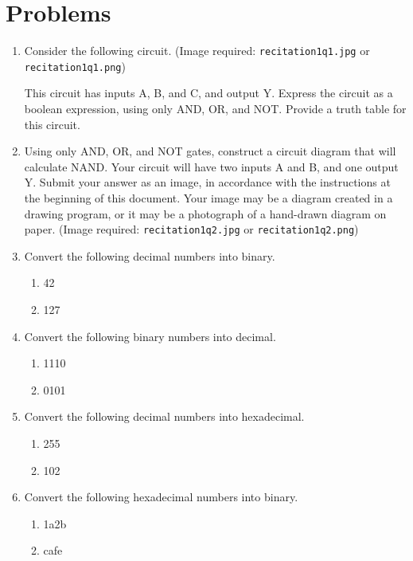 \documentclass{article}
\begin{document}
\section*{Problems}
\begin{enumerate}
    \item Consider the following circuit.  (Image required: \texttt{recitation1q1.jpg} or \texttt{recitation1q1.png})

This circuit has inputs A, B, and C, and output Y.  Express the circuit as a boolean expression, using only AND, OR, and NOT. Provide a truth table for this circuit.

    \item Using only AND, OR, and NOT gates, construct a circuit diagram that will calculate NAND. Your circuit will have two inputs A and B, and one output Y.
Submit your answer as an image, in accordance with the instructions at the beginning of this document. Your image may be a diagram created in a drawing program, or it may be a photograph of a hand-drawn diagram on paper. (Image required: \texttt{recitation1q2.jpg} or \texttt{recitation1q2.png})

    \item Convert the following decimal numbers into binary.
    \begin{enumerate}
        \item 42
        \item 127
    \end{enumerate}

    \item Convert the following binary numbers into decimal.
    \begin{enumerate}
        \item 1110
        \item 0101
    \end{enumerate}

    \item Convert the following decimal numbers into hexadecimal.
    \begin{enumerate}
        \item 255
        \item 102
    \end{enumerate}

    \item Convert the following hexadecimal numbers into binary.
    \begin{enumerate}
        \item 1a2b
        \item cafe
    \end{enumerate}


\end{enumerate}
\end{document}
